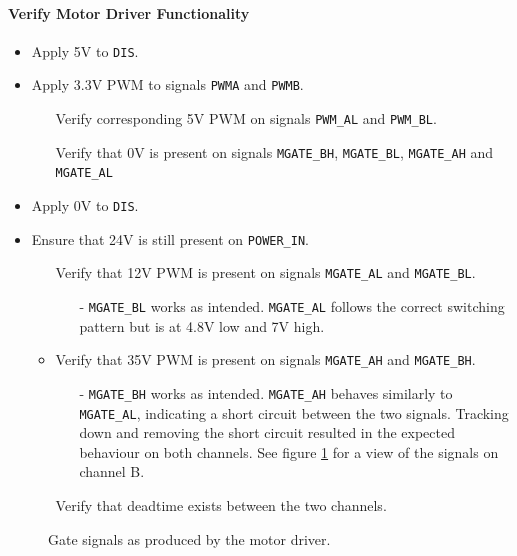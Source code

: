 \paragraph{Verify Motor Driver Functionality} %
\label{par:verify_motor_driver_functionality}
\begin{itemize}
	\item Apply 5V to \texttt{DIS}.
	\item Apply 3.3V PWM to signals \texttt{PWMA} and \texttt{PWMB}.
	\begin{itemize}
		\item[\cmark] Verify corresponding 5V PWM on signals \texttt{PWM\_AL} and \texttt{PWM\_BL}.
		\item[\cmark] Verify that 0V is present on signals \texttt{MGATE\_BH}, \texttt{MGATE\_BL}, \texttt{MGATE\_AH} and \texttt{MGATE\_AL}
	\end{itemize}
	\item Apply 0V to \texttt{DIS}.
	\item Ensure that 24V is still present on \texttt{POWER\_IN}.
	\begin{itemize}
		\item[\xmark] Verify that 12V PWM is present on signals \texttt{MGATE\_AL} and \texttt{MGATE\_BL}.
		\begin{itemize}
			\item[-] \texttt{MGATE\_BL} works as intended.
			\texttt{MGATE\_AL} follows the correct switching pattern but is at 4.8V low and 7V high.  
		\end{itemize}
		\item Verify that 35V PWM is present on signals \texttt{MGATE\_AH} and \texttt{MGATE\_BH}.
		\begin{itemize}
			\item [-] \texttt{MGATE\_BH} works as intended.
			\texttt{MGATE\_AH} behaves similarly to \texttt{MGATE\_AL}, indicating a short circuit between the two signals.
			Tracking down and removing the short circuit resulted in the expected behaviour on both channels.
			See figure \ref{fig:controllerboardv2_gate_b} for a view of the signals on channel B.
		\end{itemize}
		\item[\cmark] Verify that deadtime exists between the two channels.
	\end{itemize}
\end{itemize}


\begin{figure}[h]
	\centering
	\caption{Gate signals as produced by the motor driver.}
	\label{fig:controllerboardv2_gate_b}
\end{figure}

